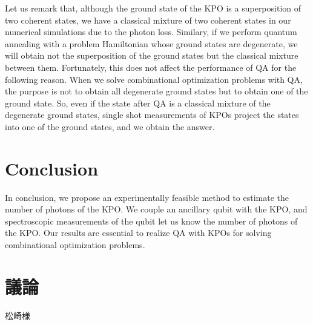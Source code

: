 Let us remark that, although the ground state of the KPO is a superposition of two coherent states, we have a classical mixture of two coherent states in our numerical simulations
due to the photon loss.
Similary, if we perform quantum annealing with a problem Hamiltonian whose ground states are degenerate, we will obtain not the superposition of the ground states but the classical mixture between them.
Fortunately, this does not affect the performance of QA for the following reason.
When we solve combinational optimization problems with QA, the purpose is not to obtain all degenerate ground states 
but to obtain one of the ground state. So, even if the state after QA is a classical mixture of the degenerate ground states, single shot measurements of KPOs project the states into one of the ground states, and we obtain the answer. 



\section{Conclusion}
In conclusion, we propose an experimentally feasible method to estimate the number of photons of the KPO. We couple an ancillary qubit with the KPO, and spectroscopic measurements of the qubit let us know the number of photons of the KPO. Our results are essential to realize QA with KPOs for solving combinational optimization problems.




\section{議論}
松崎様

